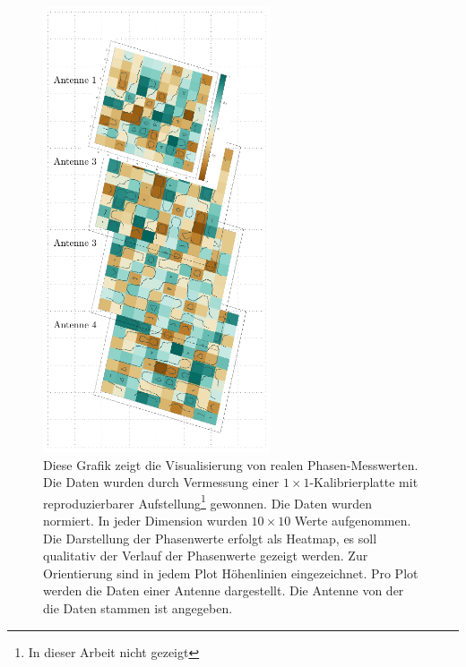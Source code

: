 \begin{figure}[ht!]
         \centering
         \includegraphics[width=0.6\textwidth]{img/complexitiy1.pdf}
         \caption[Normierte Messwerte von Kalibriermessung]{Diese Grafik zeigt die Visualisierung von realen Phasen-Messwerten. Die Daten wurden durch Vermessung einer $1\times1$-Kalibrierplatte mit reproduzierbarer Aufstellung\footnote{In dieser Arbeit nicht gezeigt} gewonnen. Die Daten wurden normiert. In jeder Dimension wurden $10\times10$ Werte aufgenommen. Die Darstellung der Phasenwerte erfolgt als Heatmap, es soll qualitativ der Verlauf der Phasenwerte gezeigt werden. Zur Orientierung sind in jedem Plot Höhenlinien eingezeichnet. Pro Plot werden die Daten einer Antenne dargestellt. Die Antenne von der die Daten stammen ist angegeben.}
         \label{fig:Complexity1}
%
\end{figure}

